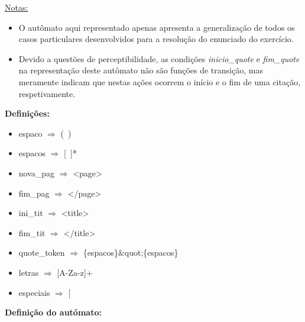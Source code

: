 \documentclass[11pt,a4paper]{report}
\begin{document}
	\vspace{0.5cm}

\underline{Notas:}
\begin{itemize}
	\item O autômato aqui representado apenas apresenta a generalização de todos os casos particulares desenvolvidos para a resolução do enunciado do exercício.
	\item Devido a questões de perceptibilidade, as condições \textit{inicio\_quote} e \textit{fim\_quote} na representação deste autômato não são funções de transição, mas meramente indicam que nestas ações ocorrem o início e o fim de uma citação, respetivamente.
\end{itemize}

	\vspace{1.0cm}

\textbf{Definições: }
\begin{itemize}
	\item espaco $\Rightarrow$ (\ )
	\item espacos $\Rightarrow$ [\ ]*
	\item nova\_pag $\Rightarrow$ <page>
	\item fim\_pag $\Rightarrow$ </page>
	\item ini\_tit $\Rightarrow$ <title>
	\item fim\_tit $\Rightarrow$ </title>
	\item quote\_token $\Rightarrow$ \{espacos\}\&quot;\{espacos\}
	\item letras $\Rightarrow$ [A-Za-z]+
	\item especiais $\Rightarrow$ [
\end{itemize}

	\vspace{0.5cm}

\textbf{Definição do autómato:}
\end{document}
